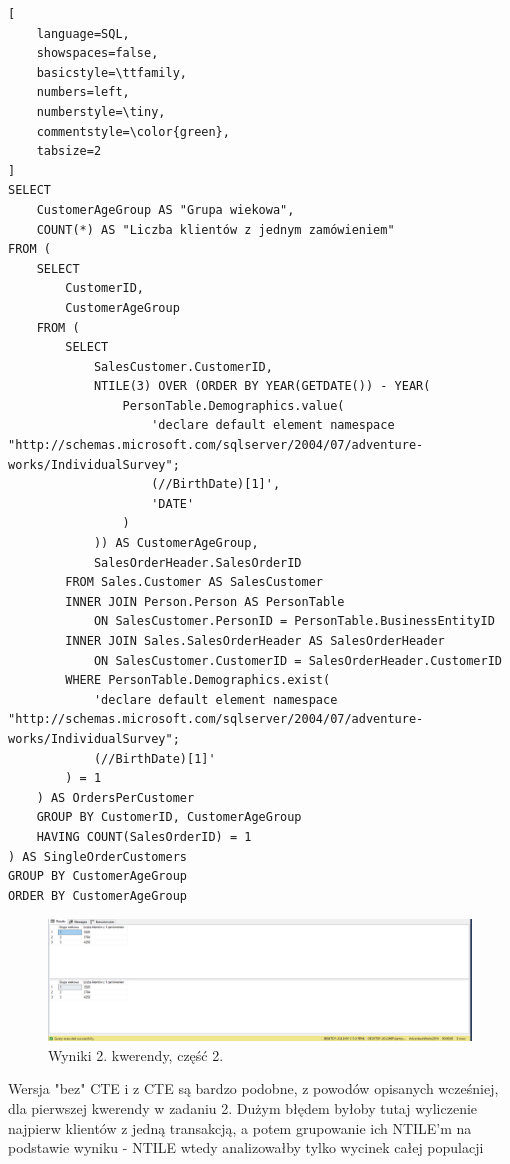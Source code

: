 \documentclass[a4paper,12pt]{article}
\begin{document}
{\small
\begin{lstlisting}[
	language=SQL,
	showspaces=false,
	basicstyle=\ttfamily,
	numbers=left,
	numberstyle=\tiny,
	commentstyle=\color{green},
	tabsize=2
]
SELECT
    CustomerAgeGroup AS "Grupa wiekowa",
    COUNT(*) AS "Liczba klientów z jednym zamówieniem"
FROM (
    SELECT 
        CustomerID,
        CustomerAgeGroup
    FROM (
        SELECT 
            SalesCustomer.CustomerID,
            NTILE(3) OVER (ORDER BY YEAR(GETDATE()) - YEAR(
                PersonTable.Demographics.value(
                    'declare default element namespace 
"http://schemas.microsoft.com/sqlserver/2004/07/adventure-works/IndividualSurvey";
                    (//BirthDate)[1]', 
                    'DATE'
                )
            )) AS CustomerAgeGroup,
            SalesOrderHeader.SalesOrderID
        FROM Sales.Customer AS SalesCustomer
        INNER JOIN Person.Person AS PersonTable 
            ON SalesCustomer.PersonID = PersonTable.BusinessEntityID
        INNER JOIN Sales.SalesOrderHeader AS SalesOrderHeader 
            ON SalesCustomer.CustomerID = SalesOrderHeader.CustomerID
        WHERE PersonTable.Demographics.exist(
            'declare default element namespace 
"http://schemas.microsoft.com/sqlserver/2004/07/adventure-works/IndividualSurvey";
            (//BirthDate)[1]'
        ) = 1
    ) AS OrdersPerCustomer
    GROUP BY CustomerID, CustomerAgeGroup
    HAVING COUNT(SalesOrderID) = 1
) AS SingleOrderCustomers
GROUP BY CustomerAgeGroup
ORDER BY CustomerAgeGroup
\end{lstlisting}}

\begin{figure}[H]
	\centering
	\includegraphics[width=1.0\textwidth]{images/2.1.png}
	\caption{Wyniki 2. kwerendy, część 2.}
\end{figure}

Wersja "bez" CTE i z CTE są bardzo podobne, z powodów opisanych wcześniej, dla pierwszej kwerendy w zadaniu 2. Dużym błędem byłoby tutaj wyliczenie najpierw klientów z jedną transakcją, a potem grupowanie ich NTILE'm na podstawie wyniku - NTILE wtedy analizowałby tylko wycinek całej populacji
\end{document}
